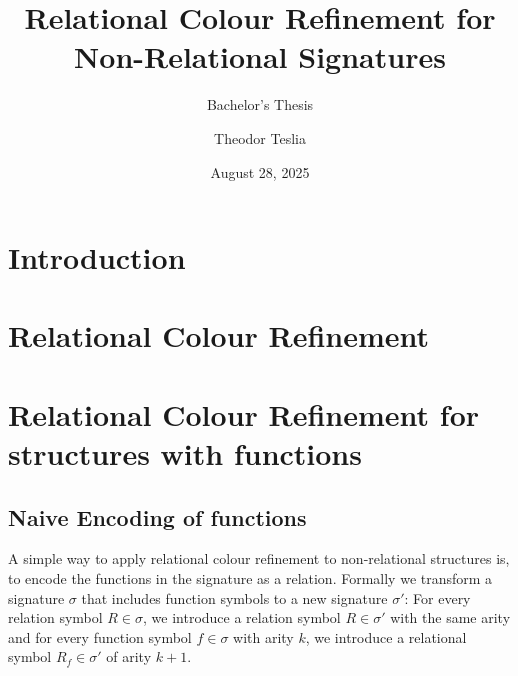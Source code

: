 \documentclass[a4paper,11pt,DIV=15]{scrartcl} %
\theoremstyle{plain}
\theoremstyle{definition}
\begin{document}
\subtitle{Bachelor's Thesis}
\date{August 28, 2025}
\publishers{RWTH Aachen University}	%

\title{Relational Colour Refinement for Non-Relational Signatures}

\author{Theodor Teslia}

\maketitle


\begin{abstract}
	\lipsum[1-2]
\end{abstract}

\thispagestyle{empty}

\clearpage



\section{Introduction}

\lipsum[2-3]

\section{Relational Colour Refinement}

\lipsum[4-5]

\clearpage

\section{Relational Colour Refinement for structures with functions}

\subsection{Naive Encoding of functions}

A simple way to apply relational colour refinement to non-relational structures is, to encode the functions in the signature as a relation.
Formally we transform a signature $\sigma$ that includes function symbols to a new signature $\sigma'$: 
For every relation symbol $R\in \sigma$, we introduce a relation symbol $R\in \sigma'$ with the same arity and for every function symbol $f\in\sigma$ with arity $k$, we introduce a relational symbol $R_f\in\sigma'$ of arity $k+1$.
\end{document}
